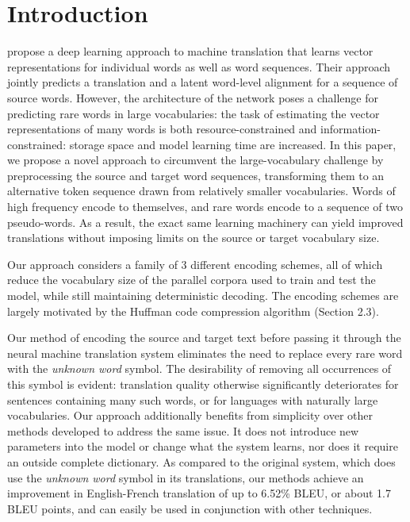 \section{Introduction}
\label{sec:intro}

 propose a deep learning approach to
machine translation that learns vector representations for individual words as
well as word sequences. Their approach jointly predicts a translation and a
latent word-level alignment for a sequence of source words. However, the architecture of
the network poses a challenge for predicting rare words in large
vocabularies: the task of estimating the vector representations of many words
is both resource-constrained and information-constrained: storage space and model learning time
are increased. In this paper, we
propose a novel approach to circumvent the large-vocabulary challenge by preprocessing the source
and target word sequences, transforming them to an alternative token sequence drawn from
relatively smaller vocabularies. Words of high frequency encode to themselves, and rare
words encode to a sequence of two pseudo-words. As a result, the exact same learning machinery
can yield improved translations without imposing limits on the source or target
vocabulary size.

Our approach considers a family of 3 different encoding schemes, all of which
reduce the vocabulary size of the parallel corpora used to train and test the model,
while still maintaining deterministic decoding. The encoding schemes are largely
motivated by the Huffman code compression algorithm (Section 2.3).

Our method of encoding the source and target text before passing it through the
neural machine translation system eliminates the need to replace every rare word with the
\emph{unknown word} symbol. The desirability of removing all occurrences of this symbol is evident: translation
quality otherwise significantly deteriorates for sentences containing many such words, or for
languages with naturally large vocabularies. Our approach additionally benefits from simplicity over
other methods developed to address the same issue. It does not introduce
new parameters into the model or change what the system learns, nor does it require an outside complete dictionary.
 As compared to the original system, which does use the \emph{unknown word} symbol in
its translations, our methods achieve an improvement in English-French translation of up to 6.52\% BLEU, or about 1.7 BLEU points,
and can easily be used in conjunction with other techniques.
